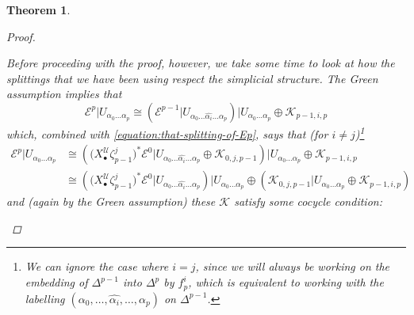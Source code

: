 \documentclass[11pt,fleqn]{article}
\theoremstyle{plain}
\newtheorem{theorem}{Theorem}[subsection]
\theoremstyle{definition}
\theoremstyle{remark}
\numberwithin{equation}{theorem}
\newcommand{\cover}{\mathcal{U}}
\newcommand{\restricted}{\mathbin{\big\vert}}
\newcommand{\nerve}[1]{X_{#1}^\cover}
\begin{document}
\begin{theorem}
\begin{proof}
\begin{enumerate}
                        Before proceeding with the proof, however, we take some time to look at how the splittings that we have been using respect the simplicial structure.
                        The Gre{}en assumption implies that
                        \begin{equation}
                        \label{equation:Ep-decomposed-into-Ep-1}
                            \mathcal{E}^p \restricted U_{\alpha_0\ldots\alpha_p}
                            \cong
                            \left(
                                \mathcal{E}^{p-1} \restricted U_{\alpha_0\ldots\widehat{\alpha_i}\ldots\alpha_p}
                            \right) \restricted U_{\alpha_0\ldots\alpha_p}
                            \oplus
                            \mathcal{K}_{p-1,i,p}
                        \end{equation}
                        which, combined with \cref{equation:that-splitting-of-Ep}, says that (for $i\neq j$)\footnote{We can ignore the case where $i=j$, since we will always be working on the embedding of $\Delta^{p-1}$ into $\Delta^p$ by $f_p^i$, which is equivalent to working with the labelling $(\alpha_0,\ldots,\widehat{\alpha_i},\ldots,\alpha_p)$ on $\Delta^{p-1}$.}
                        \begin{align*}
                            \mathcal{E}^p \restricted U_{\alpha_0\ldots\alpha_p}
                            &\cong
                            \left(
                                \big(\nerve{\bullet}\zeta_{p-1}^j\big)^* \mathcal{E}^0 \restricted U_{\alpha_0\ldots\widehat{\alpha_i}\ldots\alpha_p}
                                \oplus
                                \mathcal{K}_{0,j,p-1}
                            \right) \restricted U_{\alpha_0\ldots\alpha_p}
                            \oplus
                            \mathcal{K}_{p-1,i,p}\\
                            &\cong
                            \left(
                                \big(\nerve{\bullet}\zeta_{p-1}^j\big)^* \mathcal{E}^0 \restricted U_{\alpha_0\ldots\widehat{\alpha_i}\ldots\alpha_p}
                            \right) \restricted U_{\alpha_0\ldots\alpha_p}
                            \oplus
                            \left(
                                \mathcal{K}_{0,j,p-1} \restricted U_{\alpha_0\ldots\alpha_p}
                                \oplus
                                \mathcal{K}_{p-1,i,p}
                            \right)
                        \end{align*}
                        and (again by the Gre{}en assumption) these $\mathcal{K}$ satisfy some cocycle condition:

\end{enumerate}
\end{proof}
\end{theorem}
\end{document}
